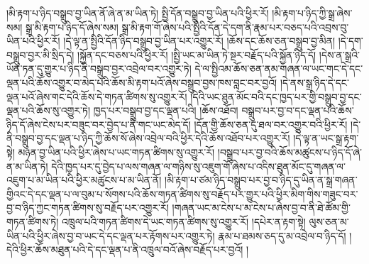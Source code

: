 །མི་རྟག་པ་ཉིད་བསྒྲུབ་བྱ་ཡིན་ནོ་ཞེ་ན་མ་ཡིན་ཏེ། སྤྱི་དོན་བསྒྲུབ་བྱ་ཡིན་པའི་ཕྱིར་རོ། །མི་རྟག་པ་ཉིད་ཀྱི་སྒྲ་ཞེས་སམ། སྒྲ་མི་རྟག་པ་ཉིད་དོ་ཞེས་སམ། སྒྲ་མི་རྟག་གོ་ཞེས་པའི་སྤྱིའི་དོན་དེ་དག་ནི་རྣམ་པར་བཅད་པའི་འབྲས་བུ་ཡིན་པའི་ཕྱིར་རོ། །དེ་ལྟ་ན་སྤྱིའི་དོན་ཉིད་བསྒྲུབ་བྱ་ཡིན་པར་འགྱུར་རོ། །ཆོས་དང་ཆོས་ཅན་བསྒྲུབ་བྱ་མིན། །དེ་དག་བསྒྲུབ་བྱར་མི་སྲིད་དེ། །སྐྱོན་དང་བཅས་པའི་ཕྱིར་རོ། །སྤྱི་ཡང་མ་ཡིན་ཏེ་སྔར་བརྗོད་པའི་སྐྱོན་ཉིད་དོ། །དེས་ན་སྒྲའི་ཡོན་ཏན་དུ་གྱུར་པ་ཉིད་ནི་བསྒྲུབ་བྱར་འབྲེལ་བར་འགྱུར་ཏེ། དེ་ལ་སྤྱིའམ་ཆོས་ཅན་ནམ་གཞན་ལ་ཡང་གང་དེ་དང་ལྡན་པའི་ཆོས་འགྱུར་བ་མེད་པའི་ཆོས་མི་རྟག་པའོ་ཞེས་བསྒྲུབ་བྱས་ཁས་བླང་བར་བྱའོ། །དེ་ནས་སྒྲ་ཉིད་དེ་དང་ལྡན་པའོ་ཞེས་གང་དེའི་ཆོས་དེ་གཏན་ཚིགས་སུ་འགྱུར་རོ། །དེའི་ཡང་ཐུན་མོང་བའི་དང་ཁྱད་པར་གྱི་བསྒྲུབ་བྱ་དང་ལྡན་པའི་ཆོས་སུ་འགྱུར་ཏེ། ཁྱད་པར་བསྒྲུབ་བྱ་དང་ལྡན་པའི། །ཆོས་འཐོབ། བསྒྲུབ་པར་བྱ་བ་དང་ལྡན་པའི་ཆོས་ཉིད་དོ་ཞེས་ངེས་པར་བཟུང་བར་བྱེད་པ་ནི་གང་ཡང་མེད་དོ། །དོན་གྱི་ཆོས་ཅན་དུ་ཐལ་བར་འགྱུར་བའི་ཕྱིར་རོ། །དེ་ནི་བསྒྲུབ་བྱ་དང་ལྡན་པ་ཉིད་ཀྱི་ཆོས་སོ་ཞེས་འབྲེལ་བའི་ཕྱིར་དེའི་ཆོས་འཐོབ་པར་འགྱུར་རོ། །དེ་ལྟ་ན་ཡང་སྒྲ་རྟག་སྟེ། མཉན་བྱ་ཡིན་པའི་ཕྱིར་ཞེས་པ་ཡང་གཏན་ཚིགས་སུ་འགྱུར་རོ། །བསྒྲུབ་པར་བྱ་བའི་ཆོས་མཚུངས་པ་ཉིད་དོ་ཞེ་ན་མ་ཡིན་ཏེ། དེའི་ཁྱད་པར་དུ་བྱེད་པ་ལས་གཞན་ལ་གཉིས་སུ་འཇུག་གོ་ཞེས་པ་འདིས་ཐུན་མོང་དུ་གཞན་ལ་འཇུག་པ་མ་ཡིན་པའི་ཕྱིར་མཚུངས་པ་མ་ཡིན་ནོ། །མི་རྟག་པ་ཙམ་ཉིད་བསྒྲུབ་པར་བྱ་བ་ཉིད་དུ་ཡིན་ན་སྒྲ་གཞན་གྱིའང་དེ་དང་ལྡན་པ་ལ་བུམ་པ་སོགས་པའི་ཆོས་གཏན་ཚིགས་སུ་བརྗོད་པར་གྱུར་པའི་ཕྱིར་མིག་གིས་གཟུང་བར་བྱ་བ་ཉིད་ཀྱང་གཏན་ཚིགས་སུ་བརྗོད་པར་འགྱུར་རོ། །གཞན་ཡང་མ་ངེས་པ་མ་ངེས་པ་ཞེས་བྱ་བ་ནི་ཐེ་ཚོམ་གྱི་གཏན་ཚིགས་ཏེ། འཁྲུལ་པའི་གཏན་ཚིགས་དེ་ཡང་གཏན་ཚིགས་སུ་འགྱུར་རོ། །དཔེར་ན་རྟག་སྟེ། ལུས་ཅན་མ་ཡིན་པའི་ཕྱིར་ཞེས་བྱ་བ་ཡང་དེ་དང་ལྡན་པར་རྟོགས་པར་འགྱུར་ཏེ། རྣམ་པ་ཐམས་ཅད་དུ་མ་འབྲེལ་བ་ཉིད་དོ། །དེའི་ཕྱིར་ཆོས་མཐུན་པའི་དེ་དང་ལྡན་པ་ནི་འཁྲུལ་བའོ་ཞེས་བརྗོད་པར་བྱའོ། །
